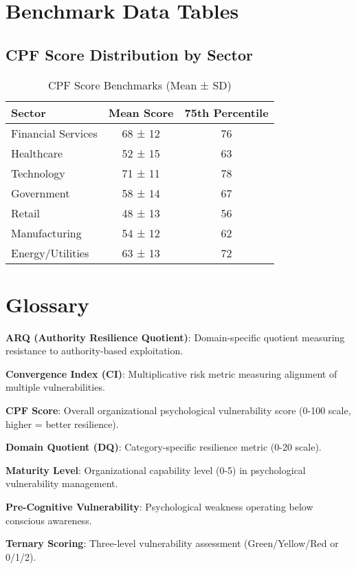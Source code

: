 \documentclass[11pt,a4paper]{article}
\begin{document}
\section{Benchmark Data Tables}

\subsection{CPF Score Distribution by Sector}

\begin{table}[h]
\centering
\caption{CPF Score Benchmarks (Mean ± SD)}
\begin{tabular}{lcc}
\toprule
\textbf{Sector} & \textbf{Mean Score} & \textbf{75th Percentile} \\
\midrule
Financial Services & 68 ± 12 & 76 \\
Healthcare & 52 ± 15 & 63 \\
Technology & 71 ± 11 & 78 \\
Government & 58 ± 14 & 67 \\
Retail & 48 ± 13 & 56 \\
Manufacturing & 54 ± 12 & 62 \\
Energy/Utilities & 63 ± 13 & 72 \\
\bottomrule
\end{tabular}
\end{table}

\section{Glossary}

\textbf{ARQ (Authority Resilience Quotient)}: Domain-specific quotient measuring resistance to authority-based exploitation.

\textbf{Convergence Index (CI)}: Multiplicative risk metric measuring alignment of multiple vulnerabilities.

\textbf{CPF Score}: Overall organizational psychological vulnerability score (0-100 scale, higher = better resilience).

\textbf{Domain Quotient (DQ)}: Category-specific resilience metric (0-20 scale).

\textbf{Maturity Level}: Organizational capability level (0-5) in psychological vulnerability management.

\textbf{Pre-Cognitive Vulnerability}: Psychological weakness operating below conscious awareness.

\textbf{Ternary Scoring}: Three-level vulnerability assessment (Green/Yellow/Red or 0/1/2).
\end{document}
